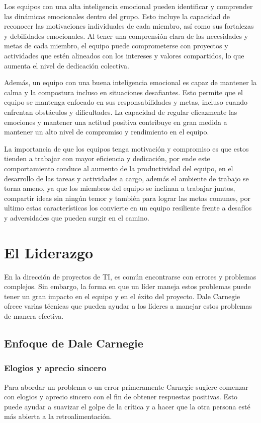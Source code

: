 \documentclass[journal]{IEEEtran}
\begin{document}
Los equipos con una alta inteligencia emocional pueden identificar y comprender las dinámicas emocionales dentro del grupo. Esto incluye la capacidad de reconocer las motivaciones individuales de cada miembro, así como sus fortalezas y debilidades emocionales. Al tener una comprensión clara de las necesidades y metas de cada miembro, el equipo puede comprometerse con proyectos y actividades que estén alineados con los intereses y valores compartidos, lo que aumenta el nivel de dedicación colectiva.

Además, un equipo con una buena inteligencia emocional es capaz de mantener la calma y la compostura incluso en situaciones desafiantes. Esto permite que el equipo se mantenga enfocado en sus responsabilidades y metas, incluso cuando enfrentan obstáculos y dificultades. La capacidad de regular eficazmente las emociones y mantener una actitud positiva contribuye en gran medida a mantener un alto nivel de compromiso y rendimiento en el equipo.

La importancia de que los equipos tenga motivación y compromiso es que estos tienden a trabajar con mayor eficiencia y dedicación, por ende este comportamiento conduce al aumento de la productividad del equipo, en el desarrollo de las tareas y actividades a cargo, además el ambiente de trabajo se torna ameno, ya que los miembros del equipo se inclinan a trabajar juntos, compartir ideas sin ningún temor y también para lograr las metas comunes, por ultimo estas características los convierte en un equipo resiliente frente a desafíos y adversidades que pueden surgir en el camino.


\section{El Liderazgo}
En la dirección de proyectos de TI, es común encontrarse con errores y problemas complejos. Sin embargo, la forma en que un líder maneja estos problemas puede tener un gran impacto en el equipo y en el éxito del proyecto. Dale Carnegie ofrece varias técnicas que pueden ayudar a los líderes a manejar estos problemas de manera efectiva.

\subsection{Enfoque de Dale Carnegie}

\subsubsection{Elogios y aprecio sincero}
Para abordar un problema o un error primeramente Carnegie sugiere comenzar con elogios y aprecio sincero con el fin de obtener respuestas positivas. Esto puede ayudar a suavizar el golpe de la crítica y a hacer que la otra persona esté más abierta a la retroalimentación.
\end{document}
